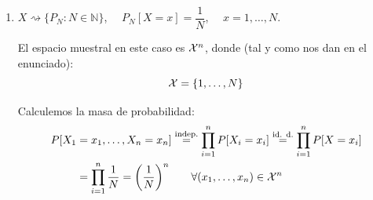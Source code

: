 \begin{ejercicio}
\begin{enumerate}[label=\alph*)]
            El espacio muestral en este caso es $\cc{X}^n$, donde:
            \begin{equation*}
                \cc{X} = \mathbb{N}\cup \{0\}
            \end{equation*}
            Recordamos que $G(p)\equiv BN(1,p)$, por lo que si sustituimos en la fórmula obtenida en la Binomial Negativa $k_0 = 1$:
            \begin{equation*}
                P[X_1=x_1, \ldots, X_n = x_n] = p^{n}{(1-p)}^{\sum\limits_{i=1}^n x_i} \qquad \forall (x_1,\ldots,x_n)\in \cc{X}^n
            \end{equation*}
        \item $X\rightsquigarrow\{P_N : N\in \mathbb{N}\}$, $\quad P_N[X=x] = \dfrac{1}{N}$, $\quad x=1,\ldots,N$.
         
            El espacio muestral en este caso es $\cc{X}^n$, donde (tal y como nos dan en el enunciado):
            \begin{equation*}
                \mathcal{X} = \{1, \ldots, N\}
            \end{equation*}
            
            Calculemos la masa de probabilidad:
            \begin{align*}
                P[X_1 &= x_1, \ldots, X_n = x_n] \stackrel{\text{indep.}}{=} \prod_{i=1}^{n}P[X_i = x_i]\stackrel{\text{id. d.}}{=} \prod_{i=1}^{n} P[X=x_i] \\
                      &= \prod_{i=1}^{n} \dfrac{1}{N} = {\left(\dfrac{1}{N}\right)}^{n} \qquad \forall (x_1,\ldots,x_n) \in \mathcal{X}^n
            \end{align*}
    \end{enumerate}
\end{ejercicio}

